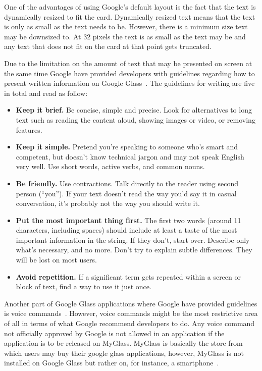 One of the advantages of using Google's default layout is the fact that the text is dynamically resized to fit the card. Dynamically resized text means that the text is only as small as the text needs to be. However, there is a minimum size text may be downsized to. At 32 pixels the text is as small as the text may be and any text that does not fit on the card at that point gets truncated.

Due to the limitation on the amount of text that may be presented on screen at the same time Google have provided developers with guidelines regarding how to present written information on Google Glass~\cite{glassDesignStyle}. The guidelines for writing are five in total and read as follow:

\begin{itemize}
	\item \textbf{Keep it brief.} Be concise, simple and precise. Look for alternatives to long text such as reading the content aloud, showing images or video, or removing features.
	\item \textbf{Keep it simple.} Pretend you're speaking to someone who's smart and competent, but doesn't know technical jargon and may not speak English very well. Use short words, active verbs, and common nouns.
	\item \textbf{Be friendly.} Use contractions. Talk directly to the reader using second person (``you''). If your text doesn't read the way you'd say it in casual conversation, it's probably not the way you should write it.
	\item \textbf{Put the most important thing first.} The first two words (around 11 characters, including spaces) should include at least a taste of the most important information in the string. If they don't, start over. Describe only what's necessary, and no more. Don't try to explain subtle differences. They will be lost on most users.
	\item \textbf{Avoid repetition.} If a significant term gets repeated within a screen or block of text, find a way to use it just once.
\end{itemize}

Another part of Google Glass applications where Google have provided guidelines is voice commands~\cite{googleGlassVoiceCommand}. However, voice commands might be the most restrictive area of all in terms of what Google recommend developers to do. Any voice command not officially approved by Google is not allowed in an application if the application is to be released on MyGlass. MyGlass is basically the store from which users may buy their google glass applications, however, MyGlass is not installed on Google Glass but rather on, for instance, a smartphone~\cite{myGlass}.

